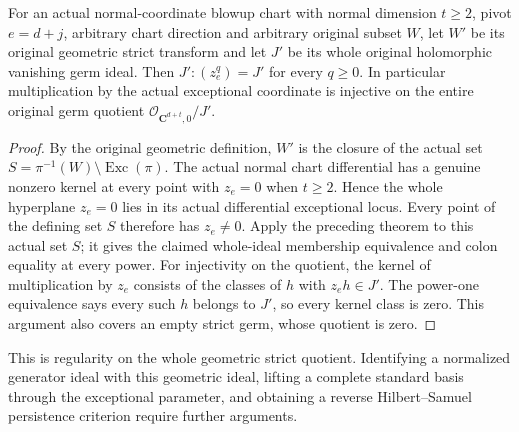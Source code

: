 \begin{theorem}
\label{hir:actual-geometric-strict-exceptional-parameter-regular}
\leanok
For an actual normal-coordinate blowup chart with normal dimension
$t\ge2$, pivot $e=d+j$, arbitrary chart direction and arbitrary original
subset $W$, let $W'$ be its original geometric strict transform and let
$J'$ be its whole original holomorphic vanishing germ ideal. Then
$J':(z_e^q)=J'$ for every $q\ge0$. In particular multiplication by the
actual exceptional coordinate is injective on the entire original germ
quotient $\mathcal O_{\mathbf C^{d+t},0}/J'$.
\end{theorem}
\begin{proof}
By the original geometric definition, $W'$ is the closure of the actual
set $S=\pi^{-1}(W)\setminus\operatorname{Exc}(\pi)$. The actual normal
chart differential has a genuine nonzero kernel at every point with
$z_e=0$ when $t\ge2$. Hence the whole hyperplane $z_e=0$ lies in its
actual differential exceptional locus. Every point of the defining set
$S$ therefore has $z_e\ne0$. Apply the preceding theorem to this actual
set $S$; it gives the claimed whole-ideal membership equivalence and
colon equality at every power. For injectivity on the quotient, the
kernel of multiplication by $z_e$ consists of the classes of $h$ with
$z_eh\in J'$. The power-one equivalence says every such $h$ belongs to
$J'$, so every kernel class is zero. This argument also covers an empty
strict germ, whose quotient is zero.
\end{proof}

This is regularity on the whole geometric strict quotient. Identifying a
normalized generator ideal with this geometric ideal, lifting a complete
standard basis through the exceptional parameter, and obtaining a reverse
Hilbert--Samuel persistence criterion require further arguments.
